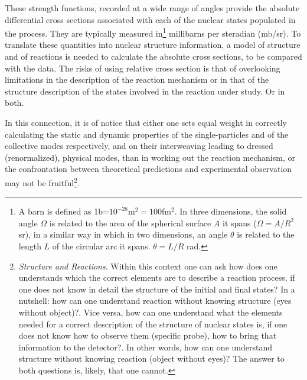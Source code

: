 These strength functions, recorded at a wide range of angles provide the absolute differential cross sections associated with each of the nuclear states populated in the process. They are  typically measured in\footnote{A barn is defined as 1b=$10^{-28}$m$^2=100$fm$^2$. In three dimensions, the solid angle $\Omega$ is related to the area of the spherical surface $A$ it spans ($\Omega=A/R^2$ sr), in a similar way in which in two dimensions, an angle $\theta$ is related to the length $L$ of the circular arc it spans. $\theta=L/R$ rad.} millibarns per  steradian (mb/sr). To translate these quantities into nuclear structure information, a model of structure and of reactions is needed to calculate the absolute cross sections, to be compared with the data. The risks of using relative cross section is that of overlooking limitations in the description of the reaction mechanism or in that of the structure description of the states involved in the reaction under study. Or in both.

In this connection, it is of notice that either one sets equal weight in correctly calculating the static and dynamic   properties  of the single-particles and of the collective modes respectively, and on their interweaving leading to dressed (renormalized), physical modes, than in working out the reaction mechanism, or the confrontation between theoretical predictions and experimental observation may not be fruitful\footnote{\textit{Structure and Reactions}. Within this context one can ask how does one understands which the correct elements are to describe a reaction process, if one does not know in detail the structure of the initial and final states? In a nutshell: how can one understand reaction without knowing structure (eyes without object)?. 
Vice versa, how can one understand what the elements needed for a correct description of the structure of nuclear states is, if one does not know how to observe them (specific probe), how to bring that information to the detector?. In other words, how can one understand structure without knowing reaction (object without eyes)? The answer to both questions is, likely, that one cannot.}.

